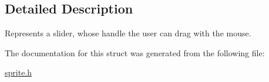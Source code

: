 \subsection{Detailed Description}
Represents a slider, whose handle the user can drag with the mouse. 

The documentation for this struct was generated from the following file\+:\begin{DoxyCompactItemize}
\item 
\mbox{\hyperlink{sprite_8h}{sprite.\+h}}\end{DoxyCompactItemize}
